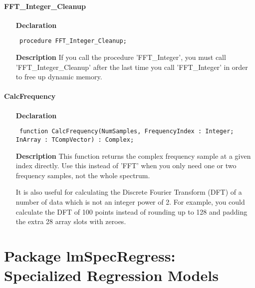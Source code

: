 \documentclass[12pt,a4paper,oneside]{report}
\newcommand{\declarationitem}[1]{\textbf{#1}}
\newcommand{\descriptiontitle}[1]{\textbf{#1}}
\newcommand{\code}[1]{\texttt{#1}}
\begin{document}
\subsubsection{FFT{\_}Integer{\_}Cleanup}
\label{ufft-FFT_Integer_Cleanup}
\begin{itemize}\item[\declarationitem{Declaration}\hfill]
	\begin{flushleft}
		\code{
			procedure FFT{\_}Integer{\_}Cleanup;}
		
	\end{flushleft}
	
	\par
	\item[\descriptiontitle{Description}]
	If you call the procedure 'FFT{\_}Integer', you must call 'FFT{\_}Integer{\_}Cleanup' after the last time you call 'FFT{\_}Integer' in order to free up dynamic memory.
	
\end{itemize}
\subsubsection{CalcFrequency}
\label{ufft-CalcFrequency}
\begin{itemize}\item[\declarationitem{Declaration}\hfill]
	\begin{flushleft}
		\code{
			function CalcFrequency(NumSamples, FrequencyIndex : Integer; InArray : TCompVector) : Complex;}
		
	\end{flushleft}
	
	\par
	\item[\descriptiontitle{Description}]
	This function returns the complex frequency sample at a given index directly. Use this instead of 'FFT' when you only need one or two frequency samples, not the whole spectrum.
	
	It is also useful for calculating the Discrete Fourier Transform (DFT) of a number of data which is not an integer power of 2. For example, you could calculate the DFT of 100 points instead of rounding up to 128 and padding the extra 28 array slots with zeroes.
	
\end{itemize}
\chapter[Package lmSpecRegress]{Package lmSpecRegress: Specialized Regression Models}\label{package-lmSpecRegress}
\end{document}
